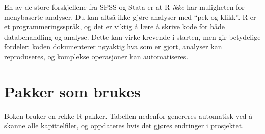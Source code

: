 \documentclass[
  norsk,
  letterpaper,
  DIV=11,
  numbers=noendperiod]{scrreprt}
\theoremstyle{definition}
\theoremstyle{remark}
\begin{document}
En av de store forskjellene fra SPSS og Stata er at R \emph{ikke} har
muligheten for menybaserte analyser. Du kan altså ikke gjøre analyser
med ``pek-og-klikk''. R er et programmeringsspråk, og det er viktig å
lære å skrive kode for både databehandling og analyse. Dette kan virke
krevende i starten, men gir betydelige fordeler: koden dokumenterer
nøyaktig hva som er gjort, analyser kan reproduseres, og komplekse
operasjoner kan automatiseres.

\section*{Pakker som brukes}\label{pakker-som-brukes}


Boken bruker en rekke R-pakker. Tabellen nedenfor genereres automatisk
ved å skanne alle kapittelfiler, og oppdateres hvis det gjøres endringer
i prosjektet.
\end{document}
